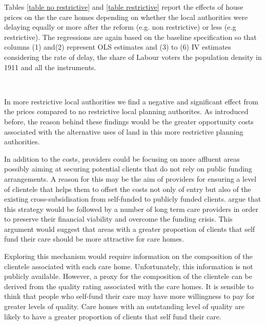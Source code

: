 \documentclass[12pt,letterpaper]{article}
\begin{document}
  {}

Tables \ref{table no restrictive} and \ref{table restrictive} report the effects of house prices on the 
the care homes depending on whether the local authorities were delaying equally or more 
after the reform (e.g. non restrictive) or less (e.g restrictive). The regressions are again based on the 
baseline specification so that columns (1) and(2) represent OLS estimates and (3) to (6) IV estimates considering the rate of delay, the share of Labour voters 
the population density in 1911 and all the instruments. 

 {}\\
  {}

In more restrictive local authorities we find a negative and significant effect from the prices 
compared to no restrictive local planning authorites. As introduced before, the 
reason behind these findings would be the greater opportunity costs associated 
with the alternative uses of land in this more restrictive planning authorities. 

In addition to the costs, providers could be focusing
 on more affluent areas possibly aiming at securing potential clients that do not rely on public funding 
 arrangements. A reason for this may be the aim of providers for ensuring a 
 level of clientele that helps them to offset the costs not only of entry but 
 also of the existing cross-subsidisation from self-funded to publicly funded clients.  
  \citet{humphries2016social} argue that this strategy would be followed by a number of long term
   care providers in order to preserve their financial viability and overcome the funding 
   crisis. This argument would suggest that areas with a greater proportion of clients that self fund 
   their care should be more attractive for care homes.    
   
Exploring this mechanism would require information on the
   composition of the clientele associated with each care home. Unfortunately, this information is not publicly available. 
   However, a proxy for the composition of the clientele can be derived
  from the quality rating associated with the care homes. It is sensible to think that people who 
  self-fund their care may have more willingness to pay for greater levels of 
  quality. Care homes with an outstanding level of quality are likely to have a 
  greater proportion of clients that self fund their care. 
  
\end{document}
